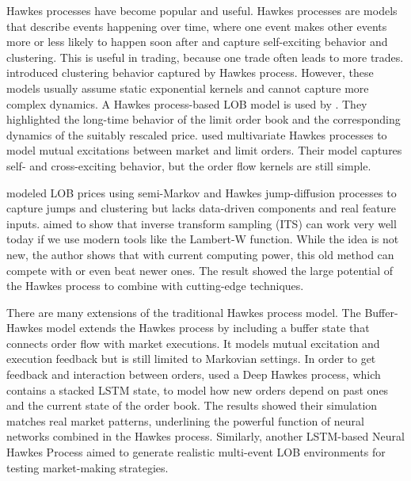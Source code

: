 Hawkes processes have become popular and useful. Hawkes processes are models that describe events happening over time, where one event makes other events more or less likely to happen soon after and capture self-exciting behavior and clustering. This is useful in trading, because one trade often leads to more trades. \cite{fonseca_clustering_2015} introduced clustering behavior captured by Hawkes process. However, these models usually assume static exponential kernels and cannot capture more complex dynamics. A Hawkes process-based LOB model is used by \cite{abergel_long-time_2015}. They highlighted the long-time behavior of the limit order book and the corresponding dynamics of the suitably rescaled price. \cite{zheng_ergodicity_2013} used multivariate Hawkes processes to model mutual excitations between market and limit orders. Their model captures self- and cross-exciting behavior, but the order flow kernels are still simple. 

\cite{lalor_algorithmic_2025} modeled LOB prices using semi-Markov and Hawkes jump-diffusion processes to capture jumps and clustering but lacks data-driven components and real feature inputs. \cite{magris_simulation_nodate} aimed to show that inverse transform sampling (ITS) can work very well today if we use modern tools like the Lambert-W function. While the idea is not new, the author shows that with current computing power, this old method can compete with or even beat newer ones. The result showed the large potential of the Hawkes process to combine with cutting-edge techniques.


There are many extensions of the traditional Hawkes process model. The Buffer-Hawkes model \citep{kaj_buffer_2017} extends the Hawkes process by including a buffer state that connects order flow with market executions. It models mutual excitation and execution feedback but is still limited to Markovian settings. In order to get feedback and interaction between orders, \cite{kumar2021deephawkesprocesshighfrequency} used a Deep Hawkes process, which contains a stacked LSTM state, to model how new orders depend on past ones and the current state of the order book. The results showed their simulation matches real market patterns, underlining the powerful function of neural networks combined in the Hawkes process. Similarly, another LSTM-based Neural Hawkes Process \citep{lalor_event-based_2025} aimed to generate realistic multi-event LOB environments for testing market-making strategies. 


